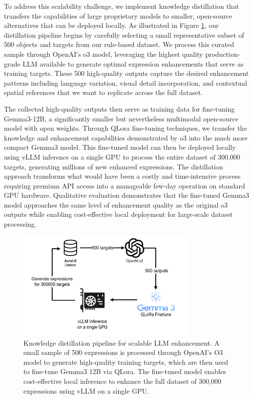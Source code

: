 To address this scalability challenge, we implement knowledge distillation that transfers the capabilities of large proprietary models to smaller, open-source alternatives that can be deployed locally. As illustrated in Figure \ref{fig:llm_distillation}, our distillation pipeline begins by carefully selecting a small representative subset of 500 objects and targets from our rule-based dataset. We process this curated sample through OpenAI's o3 model, leveraging the highest quality production-grade LLM available to generate optimal expression enhancements that serve as training targets. These 500 high-quality outputs capture the desired enhancement patterns including language variation, visual detail incorporation, and contextual spatial references that we want to replicate across the full dataset.

The collected high-quality outputs then serve as training data for fine-tuning Gemma3-12B, a significantly smaller but nevertheless multimodal open-source model with open weights. Through QLora fine-tuning techniques, we transfer the knowledge and enhancement capabilities demonstrated by o3 into the much more compact Gemma3 model. This fine-tuned model can then be deployed locally using vLLM inference on a single GPU to process the entire dataset of 300,000 targets, generating millions of new enhanced expressions. The distillation approach transforms what would have been a costly and time-intensive process requiring premium API access into a manageable few-day operation on standard GPU hardware. Qualitative evaluation demonstrates that the fine-tuned Gemma3 model approaches the same level of enhancement quality as the original o3 outputs while enabling cost-effective local deployment for large-scale dataset processing.

\begin{figure}[H]
\centering
\includegraphics[width=0.8\textwidth]{Images/distillation.png}
\caption{Knowledge distillation pipeline for scalable LLM enhancement. A small sample of 500 expressions is processed through OpenAI's O3 model to generate high-quality training targets, which are then used to fine-tune Gemma3 12B via QLora. The fine-tuned model enables cost-effective local inference to enhance the full dataset of 300,000 expressions using vLLM on a single GPU.}
\label{fig:llm_distillation}
\end{figure}

